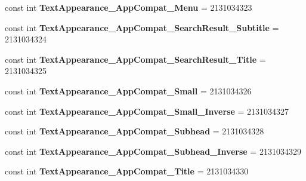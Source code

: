 \begin{DoxyCompactItemize}
\item 
\hypertarget{classClient_1_1Droid_1_1Resource_1_1Style_a99a657a6ba43f3c633517b24f6c5e43b}{}const int {\bfseries Text\+Appearance\+\_\+\+App\+Compat\+\_\+\+Menu} = 2131034323\label{classClient_1_1Droid_1_1Resource_1_1Style_a99a657a6ba43f3c633517b24f6c5e43b}

\item 
\hypertarget{classClient_1_1Droid_1_1Resource_1_1Style_a01d3bcbab4ae8e2ad5e8194d7f702bae}{}const int {\bfseries Text\+Appearance\+\_\+\+App\+Compat\+\_\+\+Search\+Result\+\_\+\+Subtitle} = 2131034324\label{classClient_1_1Droid_1_1Resource_1_1Style_a01d3bcbab4ae8e2ad5e8194d7f702bae}

\item 
\hypertarget{classClient_1_1Droid_1_1Resource_1_1Style_a2141dac4194d4b1ac46ba3ad14819192}{}const int {\bfseries Text\+Appearance\+\_\+\+App\+Compat\+\_\+\+Search\+Result\+\_\+\+Title} = 2131034325\label{classClient_1_1Droid_1_1Resource_1_1Style_a2141dac4194d4b1ac46ba3ad14819192}

\item 
\hypertarget{classClient_1_1Droid_1_1Resource_1_1Style_a142ad36bce675360aaace800f76a2a87}{}const int {\bfseries Text\+Appearance\+\_\+\+App\+Compat\+\_\+\+Small} = 2131034326\label{classClient_1_1Droid_1_1Resource_1_1Style_a142ad36bce675360aaace800f76a2a87}

\item 
\hypertarget{classClient_1_1Droid_1_1Resource_1_1Style_a5d5059521024218ba42408e35c480200}{}const int {\bfseries Text\+Appearance\+\_\+\+App\+Compat\+\_\+\+Small\+\_\+\+Inverse} = 2131034327\label{classClient_1_1Droid_1_1Resource_1_1Style_a5d5059521024218ba42408e35c480200}

\item 
\hypertarget{classClient_1_1Droid_1_1Resource_1_1Style_a11d651ce0016a9fdcc82f3826ecac01e}{}const int {\bfseries Text\+Appearance\+\_\+\+App\+Compat\+\_\+\+Subhead} = 2131034328\label{classClient_1_1Droid_1_1Resource_1_1Style_a11d651ce0016a9fdcc82f3826ecac01e}

\item 
\hypertarget{classClient_1_1Droid_1_1Resource_1_1Style_ab1296a06a81dc7271c42dc2f3d9b0d0f}{}const int {\bfseries Text\+Appearance\+\_\+\+App\+Compat\+\_\+\+Subhead\+\_\+\+Inverse} = 2131034329\label{classClient_1_1Droid_1_1Resource_1_1Style_ab1296a06a81dc7271c42dc2f3d9b0d0f}

\item 
\hypertarget{classClient_1_1Droid_1_1Resource_1_1Style_a9e5ca83b3793ade8b40cdf37b6f12765}{}const int {\bfseries Text\+Appearance\+\_\+\+App\+Compat\+\_\+\+Title} = 2131034330\label{classClient_1_1Droid_1_1Resource_1_1Style_a9e5ca83b3793ade8b40cdf37b6f12765}


\end{DoxyCompactItemize}
